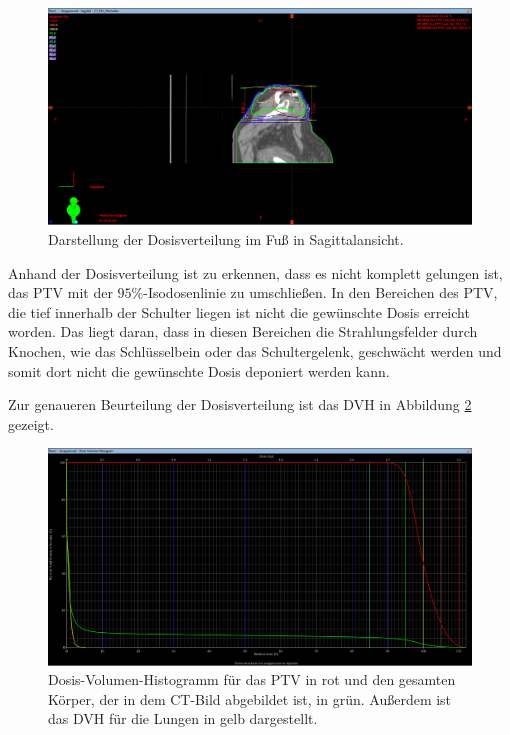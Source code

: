 \begin{figure}[H]
  \centering
  \includegraphics[width=\textwidth]{Bilder/SchulterX.png}
  \caption{Darstellung der Dosisverteilung im Fuß in Sagittalansicht.}
  \label{abb:X}
\end{figure}

Anhand der Dosisverteilung ist zu erkennen, dass es nicht komplett gelungen ist, das PTV mit
der $95\%$-Isodosenlinie zu umschließen. In den Bereichen des PTV, die tief innerhalb der Schulter liegen
ist nicht die gewünschte Dosis erreicht worden. Das liegt daran, dass in diesen Bereichen die Strahlungsfelder
durch Knochen, wie das Schlüsselbein oder das Schultergelenk, geschwächt werden und somit dort nicht die gewünschte Dosis deponiert werden kann.

Zur genaueren Beurteilung der Dosisverteilung ist das DVH in Abbildung \ref{abb:DVH} gezeigt.

\begin{figure}[H]
  \centering
  \includegraphics[width=\textwidth]{Bilder/DVH_SchulterEinzel.png}
  \caption{Dosis-Volumen-Histogramm für das PTV in rot und den gesamten Körper, der in dem CT-Bild abgebildet ist, in grün. Außerdem ist das DVH für die
  Lungen in gelb dargestellt.}
  \label{abb:DVH}
\end{figure}

